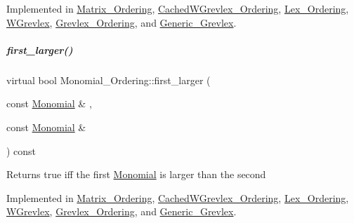 Implemented in \hyperlink{group__orderinggroup_a36f19a053b608126d1e35e62e6c35e35}{Matrix\+\_\+\+Ordering}, \hyperlink{group__orderinggroup_afcba2ade4149724f666064643e502769}{Cached\+W\+Grevlex\+\_\+\+Ordering}, \hyperlink{group__orderinggroup_a44d74f3b1e29abde22334f455979a67f}{Lex\+\_\+\+Ordering}, \hyperlink{group__orderinggroup_a0a65b26c9057d7f9d8c29ca3896cfd74}{W\+Grevlex}, \hyperlink{group__orderinggroup_a1b668700d9ccc218ebae6049bb76fb07}{Grevlex\+\_\+\+Ordering}, and \hyperlink{group__orderinggroup_ae7103c92d45f749eaf3c5403b17a2828}{Generic\+\_\+\+Grevlex}.

\mbox{\label{group__orderinggroup_aed41fe82e1ca5cd287a93d287fee7c20}} 
\subparagraph{\texorpdfstring{first\+\_\+larger()}{first\_larger()}}
{\footnotesize\ttfamily virtual bool Monomial\+\_\+\+Ordering\+::first\+\_\+larger (\begin{DoxyParamCaption}\item[{const \hyperlink{group__polygroup_class_monomial}{Monomial} \&}]{,  }\item[{const \hyperlink{group__polygroup_class_monomial}{Monomial} \&}]{ }\end{DoxyParamCaption}) const\hspace{0.3cm}{\ttfamily [pure virtual]}}

\begin{DoxyReturn}{Returns}
{\ttfamily true} iff the first \hyperlink{group__polygroup_class_monomial}{Monomial} is larger than the second 
\end{DoxyReturn}


Implemented in \hyperlink{group__orderinggroup_aed327b2dfb248ac239694717c3313e31}{Matrix\+\_\+\+Ordering}, \hyperlink{group__orderinggroup_a78e346a28a1dde835e487c01c7ce2b5a}{Cached\+W\+Grevlex\+\_\+\+Ordering}, \hyperlink{group__orderinggroup_acf085490051fdbbdde6e89831e3f0eda}{Lex\+\_\+\+Ordering}, \hyperlink{group__orderinggroup_a547c267540f69917cadbeba621642f2a}{W\+Grevlex}, \hyperlink{group__orderinggroup_a7ed2a24b293d63e26c0cdbe4270682a8}{Grevlex\+\_\+\+Ordering}, and \hyperlink{group__orderinggroup_ac412c73e940b4aabe1e350d6c98a99f5}{Generic\+\_\+\+Grevlex}.

